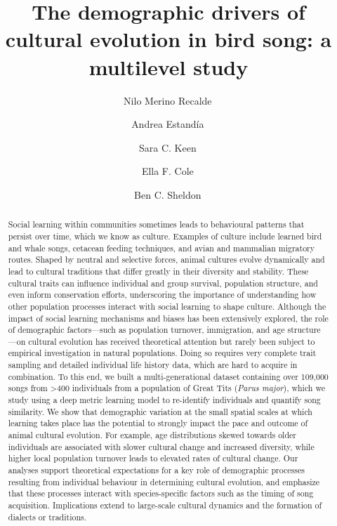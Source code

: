 \documentclass[9pt, twocolumn, twoside]{gsajnl}
\begin{document}
\title{The demographic drivers of cultural evolution in bird song: a multilevel study}
\author[1,$\ast$]{Nilo Merino Recalde\,} 
\author[1]{Andrea Estandía\,}
\author[1,2]{Sara C. Keen\,}
\author[1]{Ella F. Cole\,} 
\author[1]{Ben C. Sheldon\,} 




\begin{abstract}
Social learning within communities sometimes leads to behavioural patterns that persist over time, which we know as culture. Examples of culture include learned bird and whale songs, cetacean feeding techniques, and avian and mammalian migratory routes. Shaped by neutral and selective forces, animal cultures evolve dynamically and lead to cultural traditions that differ greatly in their diversity and stability. These cultural traits can influence individual and group survival, population structure, and even inform conservation efforts, underscoring the importance of understanding how other population processes interact with social learning to shape culture. Although the impact of social learning mechanisms and biases has been extensively explored, the role of demographic factors---such as population turnover, immigration, and age structure---on cultural evolution has received theoretical attention but rarely been subject to empirical investigation in natural populations. Doing so requires very complete trait sampling and detailed individual life history data, which are hard to acquire in combination. To this end, we built a multi-generational dataset containing over 109,000 songs from >400 individuals from a population of Great Tits (\textit{Parus major}), which we study using a deep metric learning model to re-identify individuals and quantify song similarity. We show that demographic variation at the small spatial scales at which learning takes place has the potential to strongly impact the pace and outcome of animal cultural evolution. For example, age distributions skewed towards older individuals are associated with slower cultural change and increased diversity, while higher local population turnover leads to elevated rates of cultural change. Our analyses support theoretical expectations for a key role of demographic processes resulting from individual behaviour in determining cultural evolution, and emphasize that these processes interact with species-specific factors such as the timing of song acquisition. Implications extend to large-scale cultural dynamics and the formation of dialects or traditions.
\end{abstract}
\end{document}
